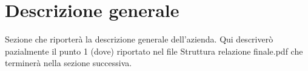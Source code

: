 \section{Descrizione generale}

Sezione che riporterà la descrizione generale dell'azienda.
Qui descriverò pazialmente il punto 1 (dove) riportato nel file Struttura relazione finale.pdf che terminerà nella sezione successiva.